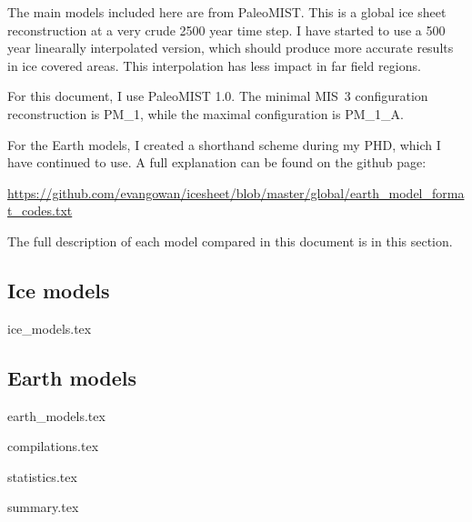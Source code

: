 \documentclass[a4paper,12pt]{article}
\begin{document}
The main models included here are from PaleoMIST. This is a global ice sheet reconstruction at a very crude 2500 year time step. I have started to use a 500 year linearally interpolated version, which should produce more accurate results in ice covered areas. This interpolation has less impact in far field regions.

For this document, I use PaleoMIST 1.0. The minimal MIS~3 configuration reconstruction is PM\_1, while the maximal configuration is PM\_1\_A.


For the Earth models, I created a shorthand scheme during my PHD, which I have continued to use. A full explanation can be found on the github page:

\url{https://github.com/evangowan/icesheet/blob/master/global/earth_model_format_codes.txt}

The full description of each model compared in this document is in this section.



\subsection{Ice models}

{ice_models.tex}

\subsection{Earth models}

{earth_models.tex}

\newpage


{compilations.tex}

\newpage

{statistics.tex}


\newpage

{summary.tex}

\clearpage

\newpage



\end{document}
